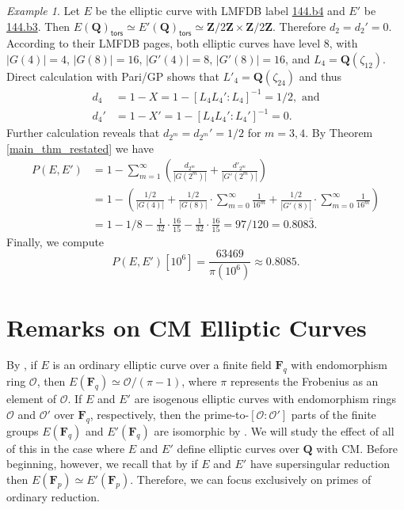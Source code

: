 \documentclass{amsart}
\newcommand{\Fq}{\mathbf{F}_{q}}
\newcommand{\Z}{\mathbf{Z}}
\newcommand{\F}{\mathbf{F}}
\newcommand{\Q}{\mathbf{Q}}
\newcommand{\tors}{\mathsf{tors}}
\numberwithin{equation}{section}
\theoremstyle{plain}
\theoremstyle{remark}
\newtheorem{exm}[equation]{Example}
\begin{document}
\begin{exm}
Let $E$ be the elliptic curve with LMFDB label \href{https://beta.lmfdb.org/EllipticCurve/Q/144/b/4}{144.b4} and $E'$ be \href{https://beta.lmfdb.org/EllipticCurve/Q/144/b/3}{144.b3}.  Then $E(\Q)_{\tors} \simeq E'(\Q)_{\tors} \simeq \Z/2\Z \times \Z/2\Z$.  Therefore $d_{2} = d_{2}' = 0$.   According to their LMFDB pages, both elliptic curves have level 8, with $|G(4)| = 4$, $|G(8)| = 16$, $|G'(4)| = 8$, $|G'(8)| = 16$, and $L_4 = \Q(\zeta_{12})$.  Direct calculation with Pari/GP shows that $L'_4 = \Q(\zeta_{24})$ and thus
\begin{align*}
d_4 &=1 -  X = 1 - [L_4L_4':L_4]^{-1} = 1/2,\text{ and} \\
d_4' &=1 -  X' = 1 - [L_4L_4':L_4']^{-1} = 0.
\end{align*}
Further calculation reveals that $d_{2^m} = d_{2^m}' = 1/2$ for $m=3,4$.  By Theorem \ref{main_thm_restated} we have
\begin{align*}
P(E,E') &=1 -   \sum_{m = 1}^\infty \left(\frac{d_{2^m}}{|G(2^m)|}  +  \frac{d'_{2^m}}{|G'(2^m)|} \right) \\
&= 1 - \left(\frac{1/2}{|G(4)|} + \frac{1/2}{|G(8)|} \cdot \sum_{m=0}^\infty \frac{1}{16^m} + \frac{1/2}{|G'(8)|} \cdot \sum_{m=0}^\infty \frac{1}{16^m} \right)\\
&= 1-  1/8 - \frac{1}{32} \cdot \frac{16}{15} - \frac{1}{32} \cdot \frac{16}{15} = 97/120 = 0.808\overline{3}.
\end{align*} 
Finally, we compute
\[
P(E,E')[10^6] = \frac{63469}{\pi(10^6)}  \approx  0.8085.
\]
\end{exm}

\section{Remarks on CM Elliptic Curves} \label{CM}

By \cite[Thm.~1]{lenstra}, if $E$ is an ordinary elliptic curve over a finite field $\Fq$ with endomorphism ring $\mathcal{O}$, then $E(\Fq) \simeq \mathcal{O}/(\pi-1)$, where $\pi$ represents the Frobenius as an element of $\mathcal{O}$.    If $E$ and $E'$ are isogenous elliptic curves with endomorphism rings $\mathcal{O}$ and $\mathcal{O}'$ over $\Fq$, respectively, then the prime-to-$[\mathcal{O}:\mathcal{O'}]$ parts of the finite groups $E(\Fq)$ and $E'(\Fq)$ are isomorphic by \cite[Lem.~2]{cullinan1}.   We will study the effect of all of this in the case where $E$ and $E'$ define elliptic curves over $\Q$ with CM.  Before beginning, however, we recall that by \cite[Thm.~2.3.1]{ck} if $E$ and $E'$ have supersingular reduction then $E(\F_p) \simeq E'(\F_p)$.  Therefore, we can focus exclusively on primes of ordinary reduction.
\end{document}
